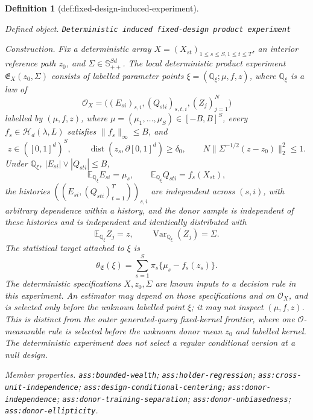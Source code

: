 \documentclass{article}
\newtheorem{definition}{Definition}
\begin{document}
\begin{definition}[def:fixed-design-induced-experiment]\label{def:fixed-design-induced-experiment}
\par\smallskip\noindent\emph{Defined object.} \texttt{Deterministic induced fixed-\allowbreak{}design product experiment}
\par\smallskip\noindent\emph{Construction.} Fix a deterministic array \(X=(X_{st})_{1\le s\le S,1\le t\le T}\), an
interior reference path \(z_0\), and
\(\Sigma\in\mathbb S_{++}^{Sd}\).  The local deterministic product
experiment \(\mathfrak E_X(z_0,\Sigma)\) consists of labelled parameter
points \(\xi=(\mathbb Q_\xi;\mu,f,z)\), where \(\mathbb Q_\xi\) is a law of
\[
 \mathcal O_X=\bigl((E_{si})_{s,i},(Q_{sti})_{s,t,i},(Z_j)_{j=1}^{N}\bigr)
\]
labelled by \((\mu,f,z)\), where
\(\mu=(\mu_1,\ldots,\mu_S)\in[-B,B]^S\), every
\(f_s\in\mathcal H_d(\lambda,L)\) satisfies \(\|f_s\|_\infty\le B\), and
\[
 z\in([0,1]^d)^S,\qquad
 \operatorname{dist}(z_s,\partial[0,1]^d)\ge\delta_0,
 \qquad N\|\Sigma^{-1/2}(z-z_0)\|_2^2\le1.
\]
Under \(\mathbb Q_\xi\), \(|E_{si}|\vee|Q_{sti}|\le B\),
\[
 \mathbb E_{\mathbb Q_\xi}E_{si}=\mu_s,
 \qquad
 \mathbb E_{\mathbb Q_\xi}Q_{sti}=f_s(X_{st}),
\]
the histories \(((E_{si},(Q_{sti})_{t=1}^{T}))_{s,i}\) are independent
across \((s,i)\), with arbitrary dependence within a history, and the donor
sample is independent of these histories and is independent and identically
distributed with
\[
 \mathbb E_{\mathbb Q_\xi}Z_j=z,
 \qquad \operatorname{Var}_{\mathbb Q_\xi}(Z_j)=\Sigma.
\]
The statistical target attached to \(\xi\) is
\[
 \theta_{\mathfrak E}(\xi)
 =\sum_{s=1}^{S}\pi_s\{\mu_s-f_s(z_s)\}.
\]
The deterministic specifications \(X,z_0,\Sigma\) are known inputs to a
decision rule in this experiment.  An estimator may depend on those
specifications and on \(\mathcal O_X\), and is selected only before the
unknown labelled point \(\xi\); it may not inspect \((\mu,f,z)\).  This is
distinct from the outer generated-query fixed-kernel frontier, where one
\(\mathcal O\)-measurable rule is selected before the unknown donor mean
\(z_0\) and labelled kernel.  The deterministic experiment does not select a
regular conditional version at a null design.
\par\smallskip\noindent\emph{Member properties.} \texttt{ass:\allowbreak{}bounded-\allowbreak{}wealth}; \texttt{ass:\allowbreak{}holder-\allowbreak{}regression}; \texttt{ass:\allowbreak{}cross-\allowbreak{}unit-\allowbreak{}independence}; \texttt{ass:\allowbreak{}design-\allowbreak{}conditional-\allowbreak{}centering}; \texttt{ass:\allowbreak{}donor-\allowbreak{}independence}; \texttt{ass:\allowbreak{}donor-\allowbreak{}training-\allowbreak{}separation}; \texttt{ass:\allowbreak{}donor-\allowbreak{}unbiasedness}; \texttt{ass:\allowbreak{}donor-\allowbreak{}ellipticity}.
\end{definition}
\end{document}
